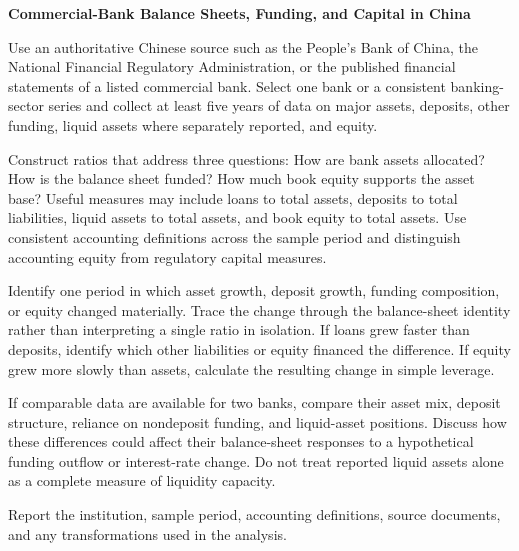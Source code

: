 

\textbf{Commercial-Bank Balance Sheets, Funding, and Capital in China}

Use an authoritative Chinese source such as the People's Bank of China,
the National Financial Regulatory Administration, or the published financial
statements of a listed commercial bank. Select one bank or a consistent
banking-sector series and collect at least five years of data on major assets,
deposits, other funding, liquid assets where separately reported, and equity.

Construct ratios that address three questions: How are bank assets allocated?
How is the balance sheet funded? How much book equity supports the asset base?
Useful measures may include loans to total assets, deposits to total liabilities,
liquid assets to total assets, and book equity to total assets. Use consistent
accounting definitions across the sample period and distinguish accounting
equity from regulatory capital measures.

Identify one period in which asset growth, deposit growth, funding composition,
or equity changed materially. Trace the change through the balance-sheet
identity rather than interpreting a single ratio in isolation. If loans grew
faster than deposits, identify which other liabilities or equity financed the
difference. If equity grew more slowly than assets, calculate the resulting
change in simple leverage.

If comparable data are available for two banks, compare their asset mix,
deposit structure, reliance on nondeposit funding, and liquid-asset positions.
Discuss how these differences could affect their balance-sheet responses to a
hypothetical funding outflow or interest-rate change. Do not treat reported
liquid assets alone as a complete measure of liquidity capacity.

Report the institution, sample period, accounting definitions, source documents,
and any transformations used in the analysis.




